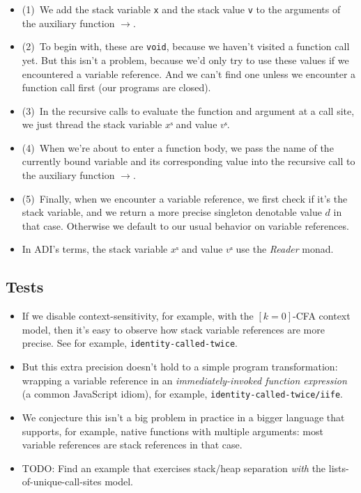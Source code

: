 \documentclass[12pt, oneside]{book}
\begin{document}
\begin{itemize}
  \item (1)~We add the stack variable \texttt{x} and the stack value \texttt{v} to the arguments of the auxiliary function \(→\).
  \item (2)~To begin with, these are \texttt{void}, because we haven’t visited a function call yet. But this isn’t a problem, because we’d only try to use these values if we encountered a variable reference. And we can’t find one unless we encounter a function call first (our programs are closed).
  \item (3)~In the recursive calls to evaluate the function and argument at a call site, we just thread the stack variable \(xˢ\) and value \(vˢ\).
  \item (4)~When we’re about to enter a function body, we pass the name of the currently bound variable and its corresponding value into the recursive call to the auxiliary function \(→\).
  \item (5)~Finally, when we encounter a variable reference, we first check if it’s the stack variable, and we return a more precise singleton denotable value \(d\) in that case. Otherwise we default to our usual behavior on variable references.
  \item In ADI’s terms, the stack variable \(xˢ\) and value \(vˢ\) use the \emph{Reader} monad.
\end{itemize}

\subsection{Tests}

\begin{itemize}
  \item If we disable context-sensitivity, for example, with the \([k=0]\)-CFA context model, then it’s easy to observe how stack variable references are more precise. See for example, \texttt{identity-called-twice}.
  \item But this extra precision doesn’t hold to a simple program transformation: wrapping a variable reference in an \emph{immediately-invoked function expression} (a common JavaScript idiom), for example, \texttt{identity-called-twice/iife}.
  \item We conjecture this isn’t a big problem in practice in a bigger language that supports, for example, native functions with multiple arguments: most variable references are stack references in that case.
  \item TODO: Find an example that exercises stack/heap separation \emph{with} the lists-of-unique-call-sites model.
\end{itemize}
\end{document}
